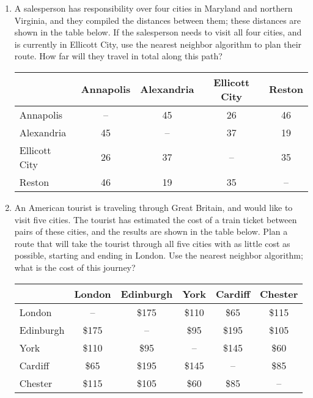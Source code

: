 \begin{enumerate}
\item A salesperson has responsibility over four cities in Maryland and northern Virginia, and they compiled the distances between them; these distances are shown in the table below.    If the salesperson needs to visit all four cities, and is currently in Ellicott City, use the nearest neighbor algorithm to plan their route.  How far will they travel in total along this path?
{\footnotesize\begin{center}
\begin{tabular}{l | c c c c}
& Annapolis & Alexandria & Ellicott City & Reston\\
\hline
Annapolis & -- & 45 & 26 & 46\\
Alexandria & 45 & -- & 37 & 19\\
Ellicott City & 26 & 37 & -- & 35\\
Reston & 46 & 19 & 35 & --
\end{tabular}
\end{center}} \text{} 

\item An American tourist is traveling through Great Britain, and would like to visit five cities.  The tourist has estimated the cost of a train ticket between pairs of these cities, and the results are shown in the table below.  Plan a route that will take the tourist through all five cities with as little cost as possible, starting and ending in London.  Use the nearest neighbor algorithm; what is the cost of this journey?
{\footnotesize\begin{center}
\begin{tabular}{l | c c c c c}
& London & Edinburgh & York & Cardiff & Chester\\
\hline
London & -- & \$175 & \$110 & \$65 & \$115\\
Edinburgh & \$175 & -- & \$95 & \$195 & \$105\\
York & \$110 & \$95 & -- & \$145 & \$60\\
Cardiff & \$65 & \$195 & \$145 & -- & \$85\\
Chester & \$115 & \$105 & \$60 & \$85 & --
\end{tabular}
\end{center}} \text{} 
\end{enumerate}